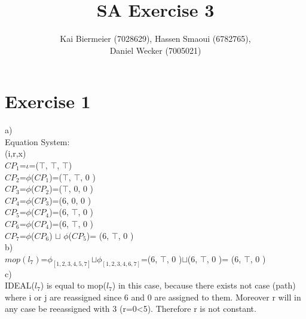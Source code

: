 \documentclass[]{article}
\title{SA Exercise 3}
\author{Kai Biermeier (7028629), Hassen Smaoui (6782765), \\ Daniel Wecker (7005021)}
\begin{document}
	
	\maketitle
	\section*{Exercise 1}
	a)\\
	Equation System:\\
	(i,r,x)\\
	$CP_1$=$\iota$=($\top$, $\top$, $\top$)\\
	$CP_2$=$\phi$($CP_1$)=($\top$, $\top$, 0 )\\
	$CP_3$=$\phi$($CP_2$)=($\top$, 0, 0 )\\
	$CP_4$=$\phi$($CP_3$)=(6, 0, 0 )\\
	$CP_5$=$\phi$($CP_4$)=(6, $\top$, 0 )\\
	$CP_6$=$\phi$($CP_4$)=(6, $\top$, 0 )\\
	$CP_7$=$\phi$($CP_6$) $\sqcup$ $\phi$($CP_5$)= (6, $\top$, 0 )\\
	b)\\
	$mop(l_7)$=$\phi_{[1,2,3,4,5,7]}$$\sqcup$$\phi_{[1,2,3,4,6,7]}$=(6, $\top$, 0 )$\sqcup$(6, $\top$, 0 )= (6, $\top$, 0 )\\
	c)\\
	IDEAL($l_7$) is equal to mop($l_7$) in this case, because there exists not case (path) where i or j are reassigned since 6 and 0 are assigned to them. Moreover r will in any case be reeassigned with 3 (r=0<5). Therefore r is not constant.
	\newpage
	
\end{document}
